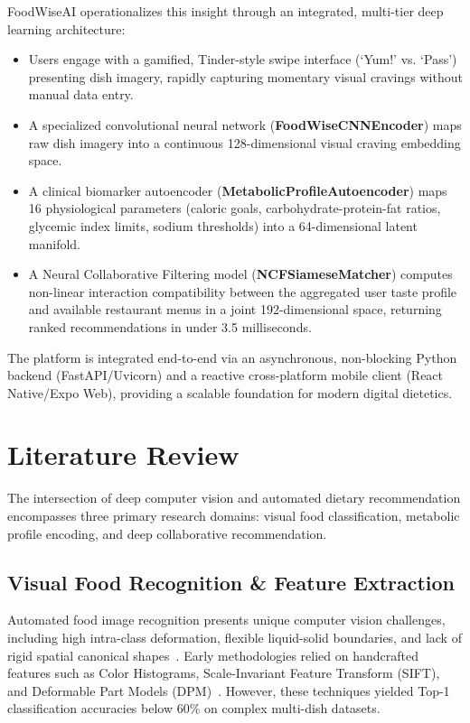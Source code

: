 \documentclass[10pt,journal,compsoc]{IEEEtran}
\begin{document}
FoodWiseAI operationalizes this insight through an integrated, multi-tier deep learning architecture:
\begin{itemize}
    \item Users engage with a gamified, Tinder-style swipe interface (`Yum!' vs. `Pass') presenting dish imagery, rapidly capturing momentary visual cravings without manual data entry.
    \item A specialized convolutional neural network (\textbf{FoodWiseCNNEncoder}) maps raw dish imagery into a continuous 128-dimensional visual craving embedding space.
    \item A clinical biomarker autoencoder (\textbf{MetabolicProfileAutoencoder}) maps 16 physiological parameters (caloric goals, carbohydrate-protein-fat ratios, glycemic index limits, sodium thresholds) into a 64-dimensional latent manifold.
    \item A Neural Collaborative Filtering model (\textbf{NCFSiameseMatcher}) computes non-linear interaction compatibility between the aggregated user taste profile and available restaurant menus in a joint 192-dimensional space, returning ranked recommendations in under 3.5 milliseconds.
\end{itemize}

The platform is integrated end-to-end via an asynchronous, non-blocking Python backend (FastAPI/Uvicorn) and a reactive cross-platform mobile client (React Native/Expo Web), providing a scalable foundation for modern digital dietetics.

\section{Literature Review}
The intersection of deep computer vision and automated dietary recommendation encompasses three primary research domains: visual food classification, metabolic profile encoding, and deep collaborative recommendation.

\subsection{Visual Food Recognition & Feature Extraction}
Automated food image recognition presents unique computer vision challenges, including high intra-class deformation, flexible liquid-solid boundaries, and lack of rigid spatial canonical shapes~\cite{bossard2014}. Early methodologies relied on handcrafted features such as Color Histograms, Scale-Invariant Feature Transform (SIFT), and Deformable Part Models (DPM)~\cite{matsuda2012}. However, these techniques yielded Top-1 classification accuracies below 60\% on complex multi-dish datasets.
\end{document}
